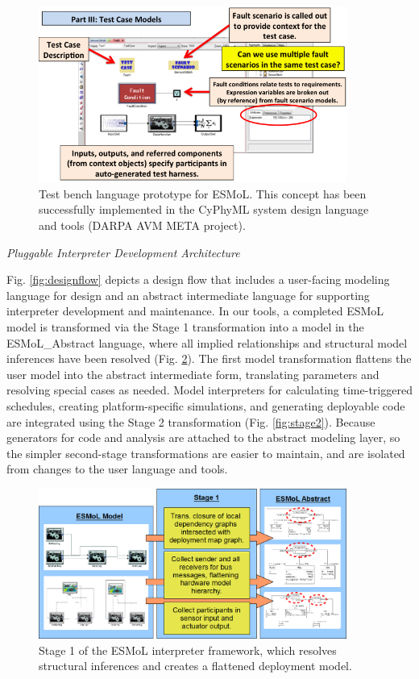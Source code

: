 \begin{figure}[thpb]
\centering
\includegraphics[width=0.9\textwidth]{img/FaultModeling4}
\caption{Test bench language prototype for ESMoL. This concept has been successfully implemented in the CyPhyML system design language and tools (DARPA AVM META project).}
\label{fig:fault4}
\end{figure}



\emph{Pluggable Interpreter Development Architecture}

Fig. \ref{fig:designflow} depicts a design flow 
that includes a user-facing modeling language 
for design and an abstract intermediate language 
for supporting interpreter development and
maintenance.  In our tools, a completed ESMoL model is 
transformed via the Stage 1 
transformation into a model in the ESMoL\_Abstract 
language, where all implied relationships and structural 
model inferences have been resolved (Fig. \ref{fig:stage1}).  
The first model transformation 
flattens the user model into the abstract intermediate form,
translating parameters and resolving special cases as needed. 
Model interpreters 
for calculating time-triggered schedules, creating 
platform-specific simulations, and generating deployable 
code are integrated using the Stage 2 transformation (Fig. \ref{fig:stage2}).
Because generators for code and analysis are attached to the abstract 
modeling layer, so the simpler second-stage transformations 
are easier to maintain, and are isolated from changes to 
the user language and tools.

\begin{figure}[thpb]
\centering
\includegraphics[width=0.9\textwidth]{img/stage1}
\caption{Stage 1 of the ESMoL interpreter framework, which resolves structural inferences and creates a flattened deployment model.}
\label{fig:stage1}
\end{figure}

